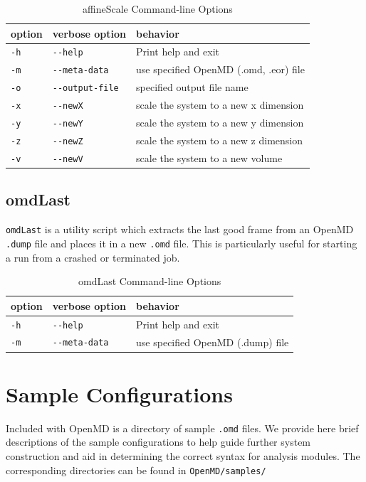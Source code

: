 \documentclass[letterpaper]{report}
\begin{document}
\begin{longtable}[c]{|EFG|}
\caption{affineScale Command-line Options}
\\ \hline
{\bf option} & {\bf verbose option} & {\bf behavior} \\ \hline
\endhead
\hline
\endfoot
{\tt -h} & {\tt -{}-help}               & Print help and exit\\
{\tt -m} & {\tt -{}-meta-data}          & use specified OpenMD (.omd, .eor) file \\
{\tt -o} & {\tt -{}-output-file}        & specified output file name \\
{\tt -x} & {\tt -{}-newX}               & scale the system to a new x dimension \\
{\tt -y} & {\tt -{}-newY}               & scale the system to a new y dimension \\
{\tt -z} & {\tt -{}-newZ}               & scale the system to a new z dimension \\
{\tt -v} & {\tt -{}-newV}               & scale the system to a new volume \\
\end{longtable}

\section{\label{section:omdLast}omdLast} 

{\tt omdLast} is a utility script which extracts the last good frame
from an OpenMD
{\tt .dump} file and places it in a new {\tt .omd} file.  This is
particularly useful for starting a run from a crashed or terminated job.

\begin{longtable}[c]{|EFG|}
\caption{omdLast Command-line Options}
\\ \hline
{\bf option} & {\bf verbose option} & {\bf behavior} \\ \hline
\endhead
\hline
\endfoot
{\tt -h} & {\tt -{}-help}               & Print help and exit\\
{\tt -m} & {\tt -{}-meta-data}          & use specified OpenMD (.dump) file \\
\end{longtable}


\chapter{\label{section:SampleConfigurations} Sample
  Configurations}
Included with OpenMD is a directory of sample {\tt .omd}
files. We provide here brief descriptions of the sample configurations
to help guide further system construction and aid in determining the
correct syntax for analysis modules. The corresponding directories can
be found in {\tt OpenMD/samples/}
\end{document}
